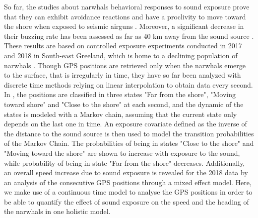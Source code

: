 \documentclass[11pt]{article}
\newcommand {\1}{\mathbb{1}}
\theoremstyle{definition}
\theoremstyle{remark}
\theoremstyle{remark}
\begin{document}
So far, the studies about narwhals behavioral responses to sound exposure prove that they can exhibit avoidance reactions and have a proclivity to move toward the shore when exposed to seismic airguns \cite{heide-jorgensen_behavioral_2021}. Moreover, a significant decrease in their buzzing rate has been assessed as far as 40 km away from the sound source \cite{tervo_narwhals_2021}. These results are based on controlled exposure experiments conducted in 2017 and 2018 in South-east Greeland, which is home to a declining population of narwhals \cite{garde_biological_2022}.  Though GPS positions are retrieved only when the narwhals emerge to the surface, that is irregularly in time, they have so far been analyzed with discrete time methods relying on linear interpolation to obtain data every second. In \cite{heide-jorgensen_behavioral_2021}, the positions are classified in three states "Far from the shore", "Moving toward shore" and "Close to the shore" at each second, and the dynamic of the states is modeled with a Markov chain, assuming that the current state only depends on the last one in time. An exposure covariate defined as the inverse of the distance to the sound source is then used to model the transition probabilities of the Markov Chain. The probabilities of being in states "Close to the shore" and "Moving toward the shore" are shown to increase with exposure to the sound, while probability of being in state "Far from the shore" decreases. Additionally, an overall speed increase due to sound exposure is revealed for the 2018 data by an analysis of the consecutive GPS positions through a mixed effect model. 
Here, we  make use of a continuous time model to analyse the GPS positions in order to be able to quantify the effect of sound exposure on the speed and the heading of the narwhals in one holistic model. \\
\end{document}
